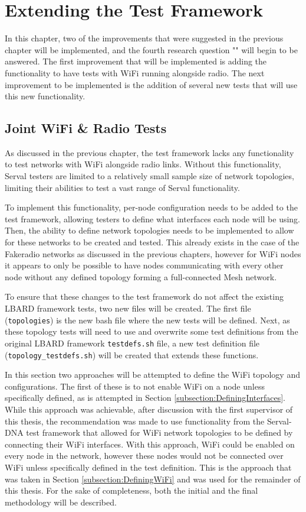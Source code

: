 
\chapter{Extending the Test Framework} %
\label{Chapter4}
In this chapter, two of the improvements that were suggested in the previous chapter will be implemented, and the fourth research question "\fourthRQ" will begin to be answered.
The first improvement that will be implemented is adding the functionality to have tests with WiFi running alongside radio.
The next improvement to be implemented is the addition of several new tests that will use this new functionality.

\section{Joint WiFi \& Radio Tests}
As discussed in the previous chapter, the test framework lacks any functionality to test networks with WiFi alongside radio links. 
Without this functionality, Serval testers are limited to a relatively small sample size of network topologies, limiting their abilities to test a vast range of Serval functionality.

To implement this functionality, per-node configuration needs to be added to the test framework, allowing testers to define what interfaces each node will be using.
Then, the ability to define network topologies needs to be implemented to allow for these networks to be created and tested.
This already exists in the case of the Fakeradio networks as discussed in the previous chapters, however for WiFi nodes it appears to only be possible to have nodes communicating with every other node without any defined topology forming a full-connected Mesh network.

To ensure that these changes to the test framework do not affect the existing LBARD framework tests, two new files will be created.
The first file (\texttt{topologies}) is the new bash file where the new tests will be defined.
Next, as these topology tests will need to use  and overwrite some test definitions from the original LBARD framework \texttt{testdefs.sh} file, a new test definition file (\texttt{topology\_testdefs.sh}) will be created that extends these functions.

In this section two approaches will be attempted to define the WiFi topology and configurations.
The first of these is to not enable WiFi on a node unless specifically defined, as is attempted in Section \ref{subsection:DefiningInterfaces}.
While this approach was achievable, after discussion with the first supervisor of this thesis, the recommendation was made to use functionality from the Serval-DNA test framework that allowed for WiFi network topologies to be defined by connecting their WiFi interfaces.
With this approach, WiFi could be enabled on every node in the network, however these nodes would not be connected over WiFi unless specifically defined in the test definition.
This is the approach that was taken in Section \ref{subsection:DefiningWiFi} and was used for the remainder of this thesis.
For the sake of completeness, both the initial and the final methodology will be described.



